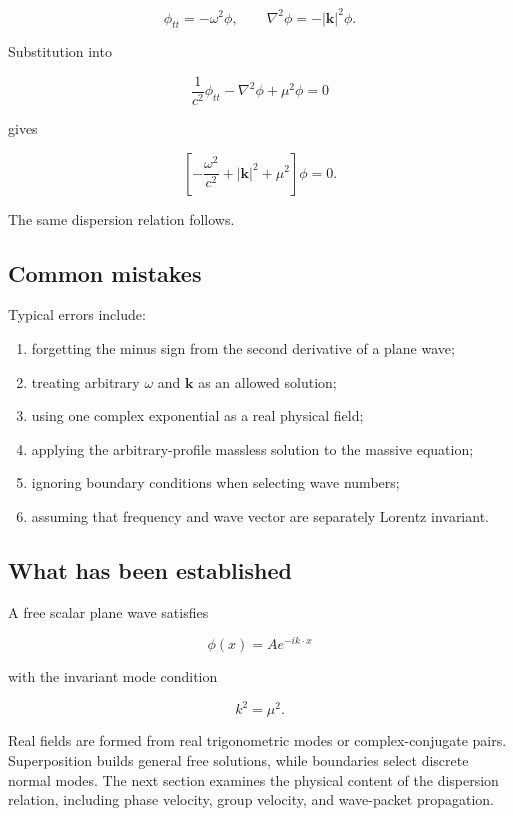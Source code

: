 \[
\phi_{tt}=-\omega^{2}\phi,
\qquad
\nabla^{2}\phi=-|\mathbf{k}|^{2}\phi.
\]

Substitution into

\[
\frac{1}{c^{2}}\phi_{tt}
-
\nabla^{2}\phi
+
\mu^{2}\phi=0
\]

gives

\[
\left[
-
\frac{\omega^{2}}{c^{2}}
+
|\mathbf{k}|^{2}
+
\mu^{2}
\right]
\phi=0.
\]

The same dispersion relation follows.

\subsection{Common mistakes}

Typical errors include:

\begin{enumerate}
    \item forgetting the minus sign from the second derivative of a plane wave;
    \item treating arbitrary \(\omega\) and \(\mathbf{k}\) as an allowed solution;
    \item using one complex exponential as a real physical field;
    \item applying the arbitrary-profile massless solution to the massive equation;
    \item ignoring boundary conditions when selecting wave numbers;
    \item assuming that frequency and wave vector are separately Lorentz invariant.
\end{enumerate}

\subsection{What has been established}

A free scalar plane wave satisfies

\[
\phi(x)=A e^{-ik\cdot x}
\]

with the invariant mode condition

\[
k^{2}=\mu^{2}.
\]

Real fields are formed from real trigonometric modes or complex-conjugate pairs. Superposition builds general free solutions, while boundaries select discrete normal modes. The next section examines the physical content of the dispersion relation, including phase velocity, group velocity, and wave-packet propagation.